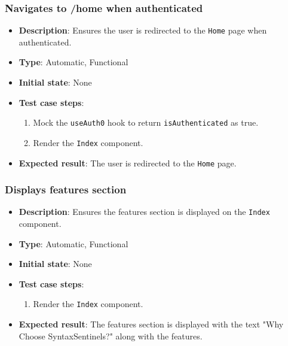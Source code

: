 \documentclass[12pt, titlepage]{article}
\begin{document}
\subsubsection{Navigates to /home when authenticated}
\begin{itemize}
    \item \textbf{Description}: Ensures the user is redirected to the \texttt{Home} page when authenticated.
    \item \textbf{Type}: Automatic, Functional
    \item \textbf{Initial state}: None
    \item \textbf{Test case steps}:
    \begin{enumerate}
        \item Mock the \texttt{useAuth0} hook to return \texttt{isAuthenticated} as true.
        \item Render the \texttt{Index} component.
    \end{enumerate}
    \item \textbf{Expected result}: The user is redirected to the \texttt{Home} page.
\end{itemize}

\subsubsection{Displays features section}
\begin{itemize}
    \item \textbf{Description}: Ensures the features section is displayed on the \texttt{Index} component.
    \item \textbf{Type}: Automatic, Functional
    \item \textbf{Initial state}: None
    \item \textbf{Test case steps}:
    \begin{enumerate}
        \item Render the \texttt{Index} component.
    \end{enumerate}
    \item \textbf{Expected result}: The features section is displayed with the text "Why Choose SyntaxSentinels?" along with the features.
\end{itemize}
\end{document}
